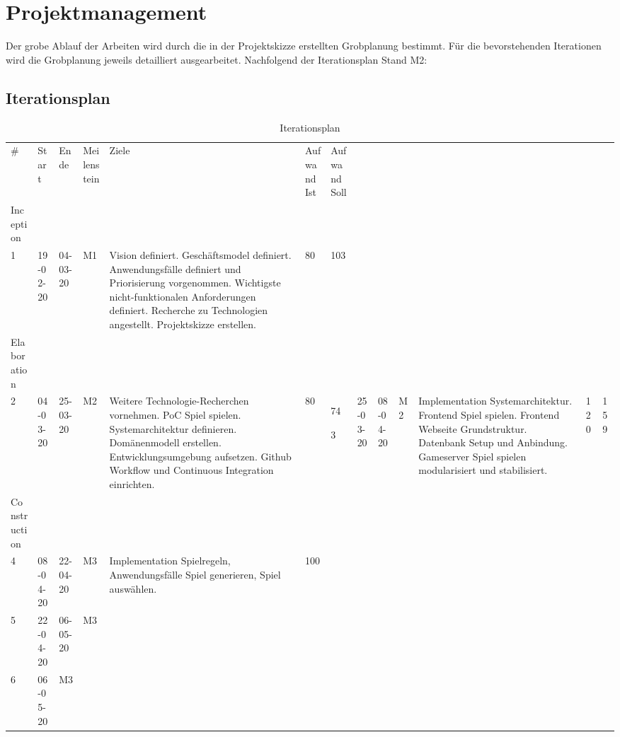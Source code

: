 \documentclass[11pt,ngerman]{article}
\begin{document}
    \section{Projektmanagement}
    Der grobe Ablauf der Arbeiten wird durch die in der Projektskizze erstellten Grobplanung bestimmt. Für die bevorstehenden Iterationen wird die Grobplanung jeweils detailliert ausgearbeitet. Nachfolgend der Iterationsplan Stand M2:

    \subsection{Iterationsplan}
    \begin{table}[H]
        \caption{Iterationsplan}
        \begin{tabularx}{\textwidth}{l l l l l l l}
            \toprule
            # & Start & Ende & Meilenstein & Ziele & Aufwand Ist & Aufwand Soll \\

            Inception &&&&&& \\

            1 & 19-02-20 & 04-03-20 & M1 & Vision definiert. Geschäftsmodel definiert. Anwendungsfälle definiert und Priorisierung vorgenommen. Wichtigste nicht-funktionalen Anforderungen definiert. Recherche zu Technologien angestellt. Projektskizze erstellen. & 80 & 103 \\

            Elaboration &&&&&& \\

            2 & 04-03-20 & 25-03-20 & M2 & Weitere Technologie-Recherchen vornehmen. PoC Spiel spielen. Systemarchitektur definieren. Domänenmodell erstellen. Entwicklungsumgebung aufsetzen. Github Workflow und Continuous Integration einrichten. & 80 & 74

            3 & 25-03-20 & 08-04-20 & M2 & Implementation Systemarchitektur. Frontend Spiel spielen. Frontend Webseite Grundstruktur. Datenbank Setup und Anbindung. Gameserver Spiel spielen modularisiert und stabilisiert. & 120 & 159 \\
            
            Construction &&&&&& \\

            4 & 08-04-20 & 22-04-20 & M3 & Implementation Spielregeln, Anwendungsfälle Spiel generieren, Spiel auswählen. & 100 & \\

            5 & 22-04-20 & 06-05-20 & M3 & & & \\

            6 & 06-05-20 & M3 & & & \\
            \toprule
        \end{tabularx}
        \label{tab:Iterationsplan}
    \end{table}
\end{document}
